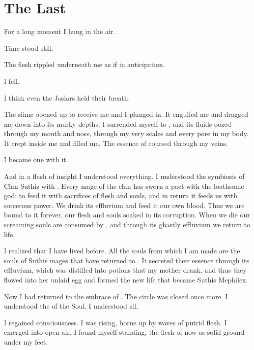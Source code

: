 \documentclass
  [a4paper,
   12pt,
   oneside
  ]%
  {article}
\begin{document}
\section{The Last \Arcanum}
For a long moment I hung in the air. 

Time stood still. 

The flesh rippled underneath me as if in anticipation. 

I fell. 

I think even the Jaslars held their breath. 

The slime opened up to receive me and I plunged in.
It engulfed me and dragged me down into its murky depths.
I surrended myself to \Ubloth, and its fluids oozed through my mouth and nose, through my very scales and every pore in my body.
It crept inside me and filled me. 
The essence of \Ubloth coursed through my veins.

I became one with it. 

And in a flash of insight I understood everything. 
I understood the symbiosis of Clan Suthis with \Ubloth. 
Every mage of the clan has sworn a pact with the loathsome god: to feed it with sacrifices of flesh and souls, and in return it feeds us with sorcerous power.  
We drink its effluvium and feed it our own blood. 
Thus we are bound to it forever, our flesh and souls soaked in its corruption. 
When we die our screaming souls are consumed by \Ubloth, and through its ghastly effluvium we return to life. 

% 

I realized that I have lived before. 
All the souls from which I am made are the souls of Suthis mages that have returned to \Ubloth.
It secreted their essence through its effluvium, which was distilled into potions that my mother drank, and thus they flowed into her unlaid egg and formed the new life that became Suthis Mephilex. 

Now I had returned to the embrace of \Ubloth. 
The circle was closed once more. 
I understood the \Arcanum of the Soul. 
I understood all. 

I regained consciousness. 
I was rising, borne up by waves of putrid flesh.
I emerged into open air.
I found myself standing, the flesh of \Ubloth now as solid ground under my feet. 
\end{document}
